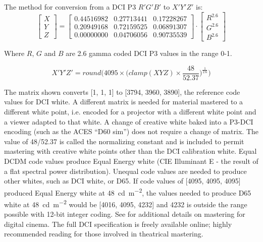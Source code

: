 The method for conversion from a DCI P3 \(R'G'B'\) to \(X'Y'Z'\) is:
\begin{equation}
    \left[ \begin{array}{c} X \\ Y \\ Z \end{array} \right] =
    \begin{bmatrix} 0.44516982 & 0.27713441 & 0.17228267 \\
                    0.20949168 & 0.72159525 & 0.06891307 \\
                    0.00000000 & 0.04706056 & 0.90735539 \end{bmatrix}
    \cdot  \left[ \begin{array}{c} R^{2.6} \\ G^{2.6} \\ B^{2.6} \end{array} \right]
\end{equation}

Where \(R\), \(G\) and \(B\) are 2.6 gamma coded DCI P3 values in the range 0-1.

\begin{equation}
    X'Y'Z' = round\big(4095 \times \big(clamp(XYZ) \times \frac{48}{52.37}\big)^{\frac{1}{2.6}}\big)
\end{equation}

The matrix shown converts [1, 1, 1] to [3794, 3960, 3890], the reference code values for DCI white.
A different matrix is needed for material mastered to a different white point, i.e.
encoded for a projector with a different white point and a viewer adapted to that white.
A change of creative white baked into a P3-DCI encoding (such as the ACES ``D60 sim'') does not require a change of matrix.
\ccPar{}
The value of 48/52.37 is called the normalizing constant and is included to permit mastering with creative white points other than the DCI calibration white.
Equal DCDM code values produce Equal Energy white (CIE Illuminant E - the result of a flat spectral power distribution).
Unequal code values are needed to produce other whites, such as DCI white, or D65.
If code values of [4095, 4095, 4095] produced Equal Energy white at \SI{48}{\candela\per\metre\squared}, the values needed to produce D65 white at \SI{48}{\candela\per\metre\squared} would be [4016, 4095, 4232] and 4232 is outside the range possible with 12-bit integer coding.
\ccPar{}
See \textcite{Kennel2007} for additional details on mastering for digital cinema.
The full DCI specification \parencite{DigitalCinemaInitiatives2018} is freely available online; highly recommended reading for those involved in theatrical mastering.

